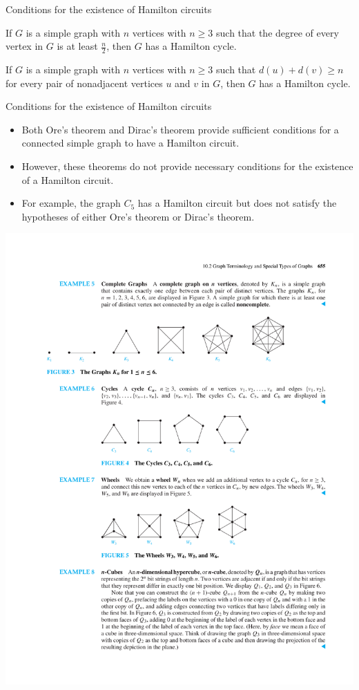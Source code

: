 \documentclass{beamer}
\theoremstyle{definition}
\begin{document}
\begin{frame}{Conditions for the existence of Hamilton circuits}
    \begin{theorem}\label{theo:dirac}
        If $G$ is a simple graph with $n$ vertices with $n\geq 3$ such that the degree of every vertex in $G$ is at least $\frac{n}{2}$, then $G$ has a Hamilton cycle. 
    \end{theorem}
    \begin{theorem}\label{theo:ore}
        If $G$ is a simple graph with $n$ vertices with $n\geq 3$ such that $d(u) + d(v) \geq n$ for every pair of nonadjacent vertices $u$ and $v$ in $G$, then $G$ has a Hamilton cycle. 
    \end{theorem}
\end{frame}

\begin{frame}{Conditions for the existence of Hamilton circuits}
    \begin{itemize}
        \item Both Ore's theorem and Dirac's theorem provide sufficient conditions for a connected simple graph to have a Hamilton circuit. 
        \item However, these theorems do not provide necessary conditions for the existence of a Hamilton circuit. 
        \item For example, the graph $C_5$ has a Hamilton circuit but does not satisfy the hypotheses of either Ore's theorem or Dirac's theorem.
    \end{itemize}
    \centering \includegraphics[trim={10cm 14cm 9cm 11cm},clip,width=.25\linewidth]{p655}
\end{frame}
\end{document}
